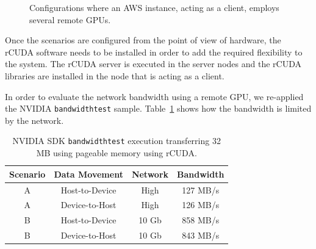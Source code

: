\documentclass[a4paper,twoside]{article}
\begin{document}
\begin{figure}[ht]
\centering
{}
\quad
{}
\caption{Configurations where an AWS instance, acting as a client, employs several remote GPUs.}
\label{fig:aws}
\end{figure}

Once the scenarios are configured from the point of view of hardware, 
the {rCUDA} software needs to be installed in order to add 
the required flexibility to the system. The {rCUDA} server is 
executed in the server nodes and the {rCUDA} libraries are installed 
in the node that is acting as a client.

In order to evaluate the network bandwidth using 
a remote GPU, we re-applied the NVIDIA {\tt bandwidthtest} sample.
Table~\ref{table:bwtrcuda} shows how the bandwidth is limited 
by the network.

\begin{table}[htb]
\renewcommand{\arraystretch}{1.3}
\caption{NVIDIA SDK {\tt bandwidthtest} execution transferring 32 MB using pageable memory using {rCUDA}.}
\label{table:bwtrcuda}
\tabcolsep=0.09cm
\begin{center}\begin{tabular}{cccc}
Scenario &  Data Movement & Network & Bandwidth \\ \hline \hline
A & Host-to-Device & High& 127 MB/s \\ \hline
A & Device-to-Host & High& 126 MB/s\\ \hline
B & Host-to-Device & 10 Gb& 858 MB/s\\ \hline
B & Device-to-Host & 10 Gb& 843 MB/s\\ \hline
\end{tabular}\end{center}\end{table}
\end{document}
